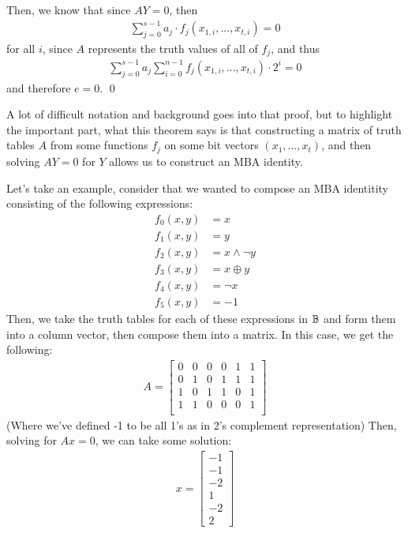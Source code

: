     Then, we know that since $AY = 0$, then
    \begin{align*}
        \sum_{j=0}^{s-1} a_j \cdot f_j(x_{1,i}, ..., x_{t, i}) = 0
    \end{align*}
    for all $i$, since $A$ represents the truth values of all of $f_j$, and thus
    \begin{align*}
        \sum_{j=0}^{s-1} a_j \sum_{i=0}^{n-1} f_j(x_{1,i}, ..., x_{t, i}) \cdot 2^{i} = 0
    \end{align*}
    and therefore $e = 0$. \qed
\par A lot of difficult notation and background goes into that proof, but
to highlight the important part, what this theorem says is that constructing
a matrix of truth tables $A$ from some functions $f_j$ on some bit vectors $(x_1, ..., x_t)$,
and then solving $AY = 0$ for $Y$ allows us to construct an MBA identity.
\par Let's take an example, consider that we wanted to compose an MBA identitity consisting
of the following expressions:
\begin{align*}
    f_0(x,y) &= x\\
    f_1(x,y) &= y\\
    f_2(x,y) &= x \land \neg y\\
    f_3(x,y) &= x \oplus y\\
    f_4(x,y) &= \neg x\\
    f_5(x,y) &= -1
\end{align*}
Then, we take the truth tables for each of these expressions in $\mathbb{B}$
and form them into a column vector, then compose them into a matrix.
In this case, we get the following:
\begin{align*}
    A =
    \begin{bmatrix}
        0 & 0 & 0 & 0 & 1 & 1\\
        0 & 1 & 0 & 1 & 1 & 1\\
        1 & 0 & 1 & 1 & 0 & 1\\
        1 & 1 & 0 & 0 & 0 & 1\\
    \end{bmatrix}
\end{align*}
(Where we've defined -1 to be all 1's as in 2's complement representation)
Then, solving for $Ax = 0$, we can take some solution:
\begin{align*}
    x = \begin{bmatrix}
    -1\\-1\\-2\\1\\-2\\2
    \end{bmatrix}
\end{align*}
